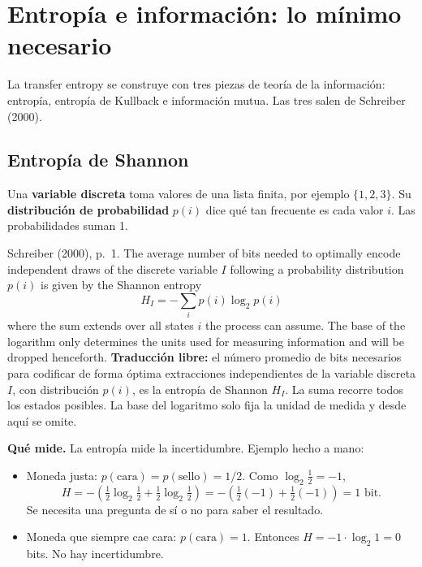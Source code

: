 \documentclass[11pt,openany]{book}
\begin{document}
\chapter{Entropía e información: lo mínimo necesario}\label{cap:info}

La transfer entropy se construye con tres piezas de teoría de la información: entropía, entropía de Kullback e información mutua. Las tres salen de Schreiber (2000).

\section{Entropía de Shannon}

\begin{nota}
Una \textbf{variable discreta} toma valores de una lista finita, por ejemplo $\{1,2,3\}$. Su \textbf{distribución de probabilidad} $p(i)$ dice qué tan frecuente es cada valor $i$. Las probabilidades suman 1.
\end{nota}

\begin{cita}{Schreiber (2000), p.~1.}
The average number of bits needed to optimally encode independent draws of the discrete variable $I$ following a probability distribution $p(i)$ is given by the Shannon entropy
\[ H_I = -\sum_i p(i)\log_2 p(i) \]
where the sum extends over all states $i$ the process can assume. The base of the logarithm only determines the units used for measuring information and will be dropped henceforth.
\tcblower
\textbf{Traducción libre:} el número promedio de bits necesarios para codificar de forma óptima extracciones independientes de la variable discreta $I$, con distribución $p(i)$, es la entropía de Shannon $H_I$. La suma recorre todos los estados posibles. La base del logaritmo solo fija la unidad de medida y desde aquí se omite.
\end{cita}

\textbf{Qué mide.} La entropía mide la incertidumbre. Ejemplo hecho a mano:
\begin{itemize}
\item Moneda justa: $p(\text{cara}) = p(\text{sello}) = 1/2$. Como $\log_2\tfrac12 = -1$,
\[ H = -\left(\tfrac12\log_2\tfrac12 + \tfrac12\log_2\tfrac12\right) = -\left(\tfrac12(-1)+\tfrac12(-1)\right) = 1 \text{ bit}. \]
Se necesita una pregunta de sí o no para saber el resultado.
\item Moneda que siempre cae cara: $p(\text{cara})=1$. Entonces $H = -1\cdot\log_2 1 = 0$ bits. No hay incertidumbre.
\end{itemize}
\end{document}
